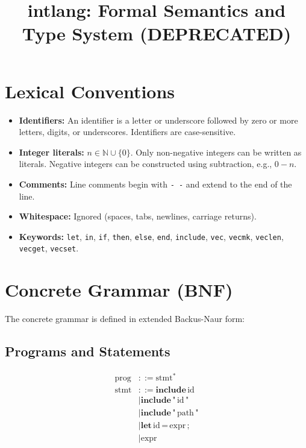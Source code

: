 \documentclass[12pt]{article}
\title{intlang: Formal Semantics and Type System (DEPRECATED)}
\author{}
\date{}
\begin{document}
\maketitle

\section{Lexical Conventions}

\begin{itemize}
  \item \textbf{Identifiers:} An identifier is a letter or underscore followed by zero or more letters, digits, or underscores. Identifiers are case-sensitive.
  \item \textbf{Integer literals:} $ n \in \mathbb{N} \cup \{0\} $. Only non-negative integers can be written as literals. Negative integers can be constructed using subtraction, e.g., $0 - n$.
  \item \textbf{Comments:} Line comments begin with \texttt{-\,-} and extend to the end of the line.
  \item \textbf{Whitespace:} Ignored (spaces, tabs, newlines, carriage returns).
  \item \textbf{Keywords:} \texttt{let}, \texttt{in}, \texttt{if}, \texttt{then}, \texttt{else}, \texttt{end}, \texttt{include}, \texttt{vec}, \texttt{vecmk}, \texttt{veclen}, \texttt{vecget}, \texttt{vecset}.
\end{itemize}

\section{Concrete Grammar (BNF)}

The concrete grammar is defined in extended Backus-Naur form:

\subsection{Programs and Statements}

\begin{align*}
\text{prog} &::= \text{stmt}^* \\
\text{stmt} &::= \textbf{include} \, \text{id} \\
            &\mid \textbf{include} \, \texttt{"} \, \text{id} \, \texttt{"} \\
            &\mid \textbf{include} \, \texttt{"} \, \text{path} \, \texttt{"} \\
            &\mid \textbf{let} \, \text{id} \, \textbf{=} \, \text{expr} \, \textbf{;} \\
            &\mid \text{expr}
\end{align*}
\end{document}
